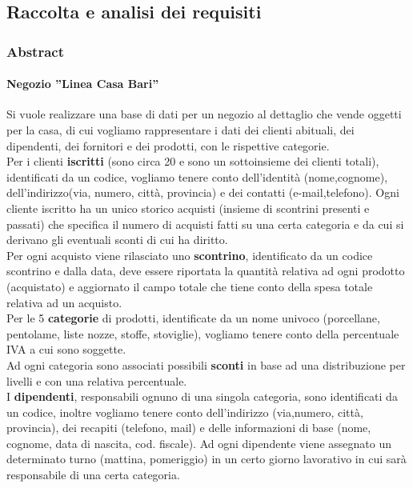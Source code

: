 \subsection{Raccolta e analisi dei requisiti}
\subsubsection{Abstract}
\paragraph*{Negozio ''Linea Casa Bari''}
Si vuole realizzare una base di dati per un negozio al dettaglio che vende oggetti per la casa, di cui vogliamo rappresentare i dati dei clienti abituali, dei dipendenti, dei fornitori e dei prodotti, con le rispettive categorie. \\

Per i clienti \textbf{iscritti} (sono circa 20 e sono un sottoinsieme dei clienti totali), identificati da un codice, vogliamo tenere conto dell'identit\`a (nome,cognome), dell'indirizzo(via, numero, citt\`a, provincia) e dei contatti (e-mail,telefono). Ogni cliente iscritto ha un unico storico acquisti (insieme di scontrini presenti e passati) che specifica il numero di acquisti fatti su una certa categoria e da cui si derivano gli eventuali sconti di cui ha diritto. \\

Per ogni acquisto viene rilasciato uno \textbf{scontrino}, identificato da un codice scontrino e dalla data, deve essere riportata la quantit\`a relativa ad ogni prodotto (acquistato) e aggiornato il campo totale che tiene conto della spesa totale relativa ad un acquisto. \\

Per le 5 \textbf{categorie} di prodotti, identificate da un nome univoco (porcellane, pentolame, liste nozze, stoffe, stoviglie), vogliamo tenere conto della percentuale IVA a cui sono soggette. \\

Ad ogni categoria sono associati possibili \textbf{sconti} in base ad una distribuzione per livelli e con una relativa percentuale. \\

I \textbf{dipendenti}, responsabili ognuno di una singola categoria, sono identificati da un codice, inoltre vogliamo tenere conto dell'indirizzo (via,numero, citt\`a, provincia), dei recapiti (telefono, mail) e delle informazioni di base (nome, cognome, data di nascita, cod. fiscale). Ad ogni dipendente viene assegnato un determinato turno (mattina, pomeriggio) in un certo giorno lavorativo in cui sar\`a responsabile di una certa categoria. \\

